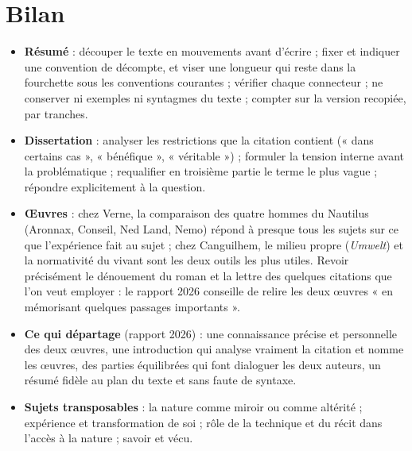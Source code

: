\documentclass[11pt,a4paper]{article}
\providecommand{\tightlist}{\setlength{\itemsep}{0pt}\setlength{\parskip}{0pt}}
\begin{document}
\hypertarget{bilan}{%
\section{Bilan}\label{bilan}}

\begin{itemize}
\tightlist
\item
  \textbf{Résumé} : découper le texte en mouvements avant d'écrire ; fixer et indiquer une convention de décompte, et viser une longueur qui reste dans la fourchette sous les conventions courantes ; vérifier chaque connecteur ; ne conserver ni exemples ni syntagmes du texte ; compter sur la version recopiée, par tranches.
\item
  \textbf{Dissertation} : analyser les restrictions que la citation contient (« dans certains cas », « bénéfique », « véritable ») ; formuler la tension interne avant la problématique ; requalifier en troisième partie le terme le plus vague ; répondre explicitement à la question.
\item
  \textbf{Œuvres} : chez Verne, la comparaison des quatre hommes du Nautilus (Aronnax, Conseil, Ned Land, Nemo) répond à presque tous les sujets sur ce que l'expérience fait au sujet ; chez Canguilhem, le milieu propre (\emph{Umwelt}) et la normativité du vivant sont les deux outils les plus utiles. Revoir précisément le dénouement du roman et la lettre des quelques citations que l'on veut employer : le rapport 2026 conseille de relire les deux œuvres « en mémorisant quelques passages importants ».
\item
  \textbf{Ce qui départage} (rapport 2026) : une connaissance précise et personnelle des deux œuvres, une introduction qui analyse vraiment la citation et nomme les œuvres, des parties équilibrées qui font dialoguer les deux auteurs, un résumé fidèle au plan du texte et sans faute de syntaxe.
\item
  \textbf{Sujets transposables} : la nature comme miroir ou comme altérité ; expérience et transformation de soi ; rôle de la technique et du récit dans l'accès à la nature ; savoir et vécu.
\end{itemize}
\end{document}

